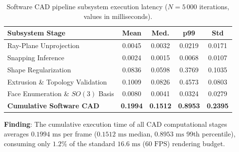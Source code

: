 \begin{table}[t]
\caption{Software CAD pipeline subsystem execution latency ($N = 5\,000$ iterations, values in milliseconds).}
\label{tab:latency}
\centering
\small
\begin{tabular}{lcccc}
\toprule
\textbf{Subsystem Stage} & \textbf{Mean} & \textbf{Med.} & \textbf{p99} & \textbf{Std} \\
\midrule
Ray-Plane Unprojection & 0.0045 & 0.0032 & 0.0219 & 0.0171 \\
Snapping Inference & 0.0024 & 0.0015 & 0.0068 & 0.0107 \\
Shape Regularization & 0.0836 & 0.0598 & 0.3769 & 0.1035 \\
Extrusion \& Topology Validation & 0.1009 & 0.0826 & 0.4573 & 0.0803 \\
Face Enumeration \& $SO(3)$ Basis & 0.0080 & 0.0041 & 0.0324 & 0.0279 \\
\midrule
\textbf{Cumulative Software CAD} & \textbf{0.1994} & \textbf{0.1512} & \textbf{0.8953} & \textbf{0.2395} \\
\bottomrule
\end{tabular}
\end{table}

\textbf{Finding}: The cumulative execution time of all CAD computational stages averages $0.1994\text{ ms}$ per frame ($0.1512\text{ ms}$ median, $0.8953\text{ ms}$ 99th percentile), consuming only $1.2\%$ of the standard $16.6\text{ ms}$ ($60\text{ FPS}$) rendering budget.


